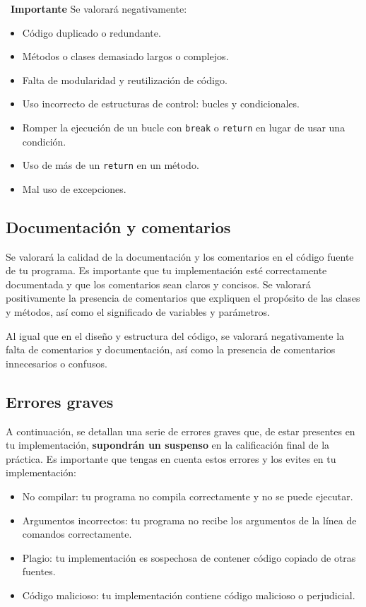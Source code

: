 \documentclass[
    a4paper, %
    12pt, %
]{CSSullivanBusinessReport}
\begin{document}
\begin{twothirdswidth}
\faExclamation~\textbf{Importante} Se valorará negativamente:

\begin{itemize}
    \item Código duplicado o redundante.
    \item Métodos o clases demasiado largos o complejos.
    \item Falta de modularidad y reutilización de código.
    \item Uso incorrecto de estructuras de control: bucles y condicionales.
    \item Romper la ejecución de un bucle con \texttt{break} o \texttt{return} en lugar de usar una condición.
    \item Uso de más de un \texttt{return} en un método.
    \item Mal uso de excepciones.
\end{itemize}

\subsection{Documentación y comentarios}\label{sec:criterios-documentacion}

Se valorará la calidad de la documentación y los comentarios en el código fuente de tu programa. Es importante que tu implementación esté correctamente documentada y que los comentarios sean claros y concisos. Se valorará positivamente la presencia de comentarios que expliquen el propósito de las clases y métodos, así como el significado de variables y parámetros.

Al igual que en el diseño y estructura del código, se valorará negativamente la falta de comentarios y documentación, así como la presencia de comentarios innecesarios o confusos.

\subsection{Errores graves}\label{sec:criterios-errores}

A continuación, se detallan una serie de errores graves que, de estar presentes en tu implementación, \textbf{supondrán un suspenso} en la calificación final de la práctica. Es importante que tengas en cuenta estos errores y los evites en tu implementación:

\begin{itemize}
    \item No compilar: tu programa no compila correctamente y no se puede ejecutar.
    \item Argumentos incorrectos: tu programa no recibe los argumentos de la línea de comandos correctamente.
    \item Plagio: tu implementación es sospechosa de contener código copiado de otras fuentes.
    \item Código malicioso: tu implementación contiene código malicioso o perjudicial.
\end{itemize}

\end{twothirdswidth}
\end{document}
